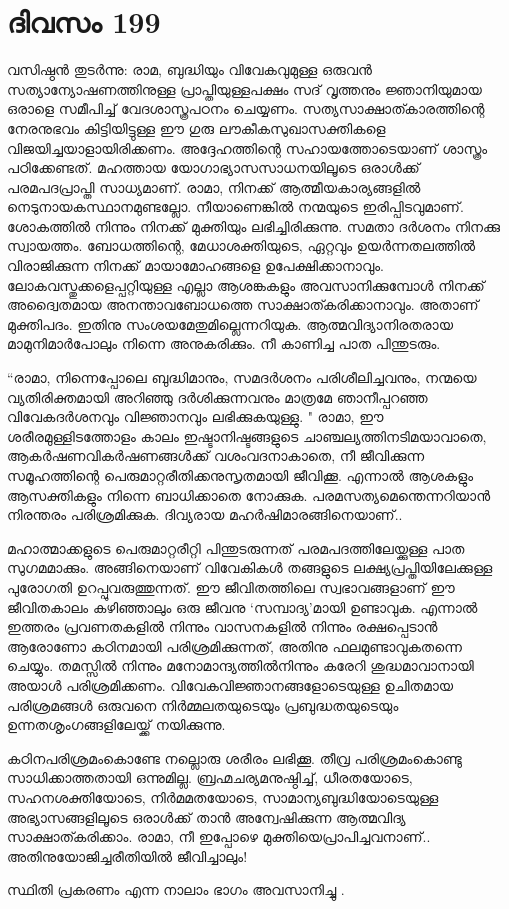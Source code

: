 \section{ദിവസം 199}


വസിഷ്ഠൻ തുടർന്നു: രാമ, ബുദ്ധിയും വിവേകവുമുള്ള ഒരുവൻ സത്യാന്യോഷണത്തിനുള്ള പ്രാപ്തിയുള്ളപക്ഷം സദ് വൃത്തനും ജ്ഞാനിയുമായ ഒരാളെ സമീപിച്ച് വേദശാസ്ത്രപഠനം ചെയ്യണം. സത്യസാക്ഷാത്കാരത്തിന്റെ നേരനുഭവം കിട്ടിയിട്ടുള്ള ഈ ഗുരു ലൗകീകസുഖാസക്തികളെ വിജയിച്ചയാളായിരിക്കണം. അദ്ദേഹത്തിന്റെ സഹായത്തോടെയാണ്‌ ശാസ്ത്രം പഠിക്കേണ്ടത്. മഹത്തായ യോഗാഭ്യാസസാധനയിലൂടെ ഒരാൾക്ക് പരമപദപ്രാപ്തി സാധ്യമാണ്‌. രാമാ, നിനക്ക് ആത്മീയകാര്യങ്ങളിൽ നെടുനായകസ്ഥാനമുണ്ടല്ലോ. നീയാണെങ്കില്‍ നന്മയുടെ ഇരിപ്പിടവുമാണ്‌. ശോകത്തിൽ നിന്നും നിനക്ക് മുക്തിയും ലഭിച്ചിരിക്കുന്നു. സമതാ ദർശനം നിനക്കു സ്വായത്തം. ബോധത്തിന്റെ, മേധാശക്തിയുടെ, ഏറ്റവും ഉയർന്നതലത്തിൽ വിരാജിക്കുന്ന നിനക്ക് മായാമോഹങ്ങളെ ഉപേക്ഷിക്കാനാവും. ലോകവസ്തുക്കളെപ്പറ്റിയുള്ള എല്ലാ ആശങ്കകളും അവസാനിക്കുമ്പോൾ നിനക്ക് അദ്വൈതമായ അനന്താവബോധത്തെ സാക്ഷാത്കരിക്കാനാവും. അതാണ്‌ മുക്തിപദം. ഇതിനു സംശയമേതുമില്ലെന്നറിയുക. ആത്മവിദ്യാനിരതരായ മാമുനിമാർപോലും നിന്നെ അനുകരിക്കും. നീ കാണിച്ച പാത പിന്തുടരും.

“രാമാ, നിന്നെപ്പോലെ ബുദ്ധിമാനും, സമദർശനം പരിശീലിച്ചവനും, നന്മയെ വ്യതിരിക്തമായി അറിഞ്ഞു ദർശിക്കുന്നവനും മാത്രമേ ഞാനീപ്പറഞ്ഞ വിവേകദർശനവും വിജ്ഞാനവും ലഭിക്കുകയുള്ളു. "  രാമാ, ഈ ശരീരമുള്ളിടത്തോളം കാലം ഇഷ്ടാനിഷ്ടങ്ങളുടെ ചാഞ്ചല്യത്തിനടിമയാവാതെ, ആകർഷണവികർഷണങ്ങൾക്ക് വശംവദനാകാതെ, നീ ജീവിക്കുന്ന സമൂഹത്തിന്റെ പെരുമാറ്റരീതിക്കനുസൃതമായി ജീവിക്കൂ. എന്നാൽ ആശകളും ആസക്തികളും നിന്നെ ബാധിക്കാതെ നോക്കുക. പരമസത്യമെന്തെന്നറിയാൻ നിരന്തരം പരിശ്രമിക്കുക. ദിവ്യരായ മഹർഷിമാരങ്ങിനെയാണ്‌..

മഹാത്മാക്കളുടെ പെരുമാറ്റരീറ്റി പിന്തുടരുന്നത് പരമപദത്തിലേയ്ക്കുള്ള പാത സുഗമമാക്കും. അങ്ങിനെയാണ്‌ വിവേകികൾ തങ്ങളുടെ ലക്ഷ്യപ്രപ്തിയിലേക്കുള്ള പുരോഗതി ഉറപ്പുവരുത്തുന്നത്. ഈ ജീവിതത്തിലെ സ്വഭാവങ്ങളാണ്‌ ഈ ജീവിതകാലം കഴിഞ്ഞാലും ഒരു ജീവനു ‘സമ്പാദ്യ’മായി ഉണ്ടാവുക. എന്നാൽ ഇത്തരം പ്രവണതകളിൽ നിന്നും വാസനകളില്‍ നിന്നും രക്ഷപ്പെടാൻ ആരോണോ കഠിനമായി പരിശ്രമിക്കുന്നത്, അതിനു ഫലമുണ്ടാവുകതന്നെ ചെയ്യും. തമസ്സിൽ നിന്നും മനോമാന്ദ്യത്തിൽനിന്നും കരേറി ശുദ്ധമാവാനായി അയാൾ പരിശ്രമിക്കണം. വിവേകവിജ്ഞാനങ്ങളോടെയുള്ള ഉചിതമായ പരിശ്രമങ്ങൾ ഒരുവനെ നിർമ്മലതയുടെയും പ്രബുദ്ധതയുടെയും ഉന്നതശൃംഗങ്ങളിലേയ്ക്ക് നയിക്കുന്നു.

കഠിനപരിശ്രമംകൊണ്ടേ നല്ലൊരു ശരീരം ലഭിക്കൂ. തീവ്ര പരിശ്രമംകൊണ്ടു സാധിക്കാത്തതായി ഒന്നുമില്ല. ബ്രഹ്മചര്യമനുഷ്ഠിച്ച്, ധീരതയോടെ, സഹനശക്തിയോടെ, നിർമമതയോടെ, സാമാന്യബുദ്ധിയോടെയുള്ള അഭ്യാസങ്ങളിലൂടെ ഒരാൾക്ക് താൻ അന്വേഷിക്കുന്ന ആത്മവിദ്യ സാക്ഷാത്കരിക്കാം. രാമാ, നീ ഇപ്പോഴെ മുക്തിയെപ്രാപിച്ചവനാണ്‌.. അതിനുയോജിച്ചരീതിയിൽ ജീവിച്ചാലും!

സ്ഥിതി പ്രകരണം എന്ന നാലാം ഭാഗം അവസാനിച്ചു .

